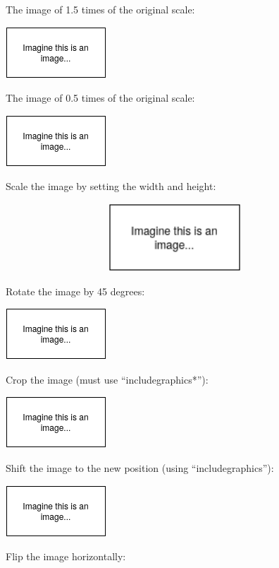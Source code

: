 \documentclass[12pt, letterpaper, oneside]{article}
\begin{document}
The image of 1.5 times of the original scale:

\includegraphics[scale=1.5]{image-1.png}

The image of 0.5 times of the original scale:

\includegraphics[scale=0.5]{image-1.png}

Scale the image by setting the width and height:

\includegraphics[width=5in,height=1in]{image-1.png}

Rotate the image by 45 degrees:

\includegraphics[angle=45]{image-1.png}

Crop the image (must use ``includegraphics*''):

\includegraphics*[viewport=30 30 130 130]{image-1.png}

Shift the image to the new position (using ``includegraphics''):

\includegraphics[viewport=80 80 130 130]{image-1.png}

Flip the image horizontally:
\end{document}
